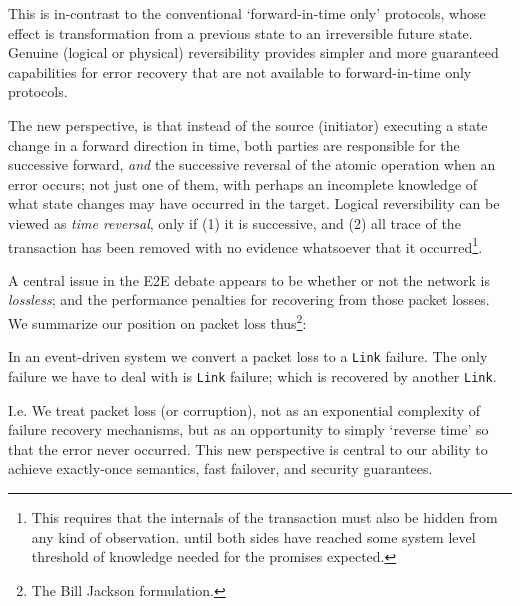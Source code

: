 This is in-contrast to the conventional `forward-in-time only' protocols, whose effect is transformation from a previous state to an irreversible future state. Genuine (logical or physical) reversibility provides simpler and more guaranteed capabilities for error recovery that are not available to forward-in-time only protocols.

The new perspective, is that instead of the source (initiator) executing a state change in a forward direction in time, both parties are responsible for the successive forward, \emph{and} the successive reversal of the atomic operation when an error occurs; not just one of them, with perhaps an incomplete knowledge of what state changes may have occurred in the target. Logical reversibility can be viewed as \emph{time reversal}, only if (1) it is successive, and (2) all trace of the transaction has been removed with no evidence whatsoever that it occurred\footnote{This requires that the internals of the transaction must also be hidden from any kind of observation. until both sides have reached some system level threshold of knowledge needed for the promises expected.}.

A central issue in the E2E debate appears to be whether or not the network is \emph{lossless}; and the performance penalties for recovering from those packet losses. 
We summarize our position on packet loss thus\footnote{The Bill Jackson formulation.}:
\begin{highlightbox}
\noindent In an event-driven system we convert a packet loss to a \texttt{Link} failure. The only failure we have to deal with is \texttt{Link}  failure; which is  recovered by another \texttt{Link}. %
\end{highlightbox}

I.e. We treat packet loss (or corruption), not as an exponential complexity of failure recovery mechanisms, but as an opportunity to simply `reverse time' so that the error never occurred.  This new perspective is central to our ability to achieve exactly-once semantics, fast failover, and security guarantees.